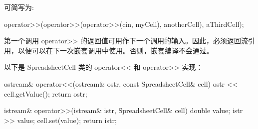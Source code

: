 可简写为:

\begin{cpp}
operator>>(operator>>(operator>>(cin, myCell), anotherCell), aThirdCell);
\end{cpp}

第一个调用 operator>{}> 的返回值可用作下一个调用的输入。因此，必须返回流引用，以便可以在下一次嵌套调用中使用。否则，嵌套编译不会通过。

以下是 SpreadsheetCell 类的 operator<{}< 和 operator>{}> 实现：

\begin{cpp}
ostream& operator<<(ostream& ostr, const SpreadsheetCell& cell)
{
    ostr << cell.getValue();
    return ostr;
}

istream& operator>>(istream& istr, SpreadsheetCell& cell)
{
    double value;
    istr >> value;
    cell.set(value);
    return istr;
}
\end{cpp}










